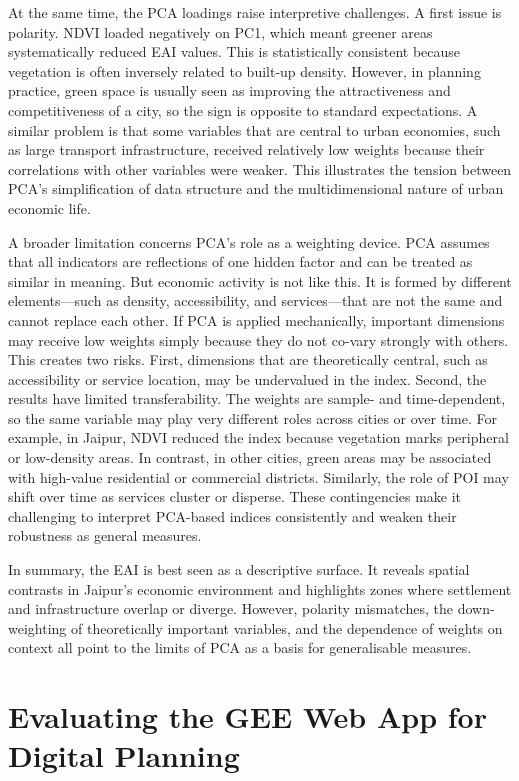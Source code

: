 \documentclass[
  12pt,
  oneside]{book}
\begin{document}
At the same time, the PCA loadings raise interpretive challenges. A first issue is polarity. NDVI loaded negatively on PC1, which meant greener areas systematically reduced EAI values. This is statistically consistent because vegetation is often inversely related to built-up density. However, in planning practice, green space is usually seen as improving the attractiveness and competitiveness of a city, so the sign is opposite to standard expectations. A similar problem is that some variables that are central to urban economies, such as large transport infrastructure, received relatively low weights because their correlations with other variables were weaker. This illustrates the tension between PCA's simplification of data structure and the multidimensional nature of urban economic life.

A broader limitation concerns PCA's role as a weighting device. PCA assumes that all indicators are reflections of one hidden factor and can be treated as similar in meaning. But economic activity is not like this. It is formed by different elements---such as density, accessibility, and services---that are not the same and cannot replace each other. If PCA is applied mechanically, important dimensions may receive low weights simply because they do not co-vary strongly with others. This creates two risks. First, dimensions that are theoretically central, such as accessibility or service location, may be undervalued in the index. Second, the results have limited transferability. The weights are sample- and time-dependent, so the same variable may play very different roles across cities or over time. For example, in Jaipur, NDVI reduced the index because vegetation marks peripheral or low-density areas. In contrast, in other cities, green areas may be associated with high-value residential or commercial districts. Similarly, the role of POI may shift over time as services cluster or disperse. These contingencies make it challenging to interpret PCA-based indices consistently and weaken their robustness as general measures.

In summary, the EAI is best seen as a descriptive surface. It reveals spatial contrasts in Jaipur's economic environment and highlights zones where settlement and infrastructure overlap or diverge. However, polarity mismatches, the down-weighting of theoretically important variables, and the dependence of weights on context all point to the limits of PCA as a basis for generalisable measures.

\section{Evaluating the GEE Web App for Digital Planning}\label{evaluating-the-gee-web-app-for-digital-planning}
\end{document}

